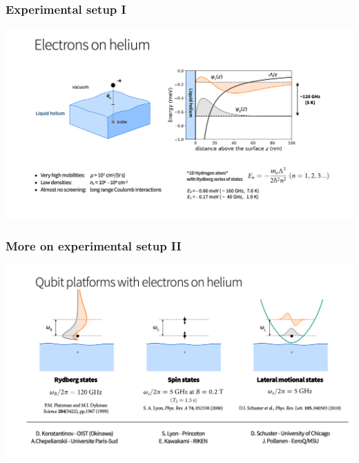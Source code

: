\documentclass{beamer}
\begin{document}
\begin{frame}
\frametitle{Experimental setup I}

\vspace{6mm}

\centerline{\includegraphics[width=1.3\linewidth]{qcfigures/Elhelium1.png}}

\vspace{6mm}
\end{frame}

\begin{frame}
\frametitle{More on experimental setup II}

\vspace{6mm}

\centerline{\includegraphics[width=1.3\linewidth]{qcfigures/Elhelium2.png}}

\vspace{6mm}
\end{frame}
\end{document}
